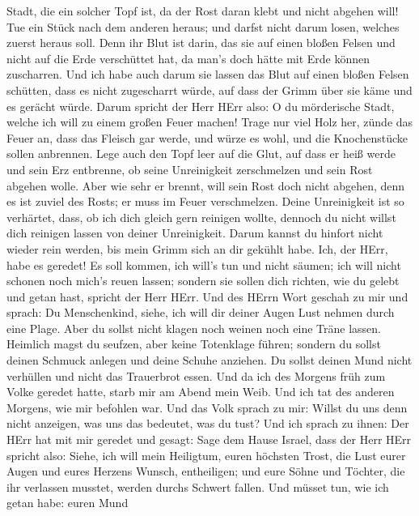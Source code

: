 Stadt, die ein solcher Topf ist, da der Rost daran klebt und nicht
abgehen will! Tue ein Stück nach dem anderen heraus; und darfst nicht
darum losen, welches zuerst heraus soll.  Denn ihr Blut ist
darin, das sie auf einen bloßen Felsen und nicht auf die Erde
verschüttet hat, da man's doch hätte mit Erde können zuscharren.
 Und ich habe auch darum sie lassen das Blut auf einen
bloßen Felsen schütten, dass es nicht zugescharrt würde, auf dass der
Grimm über sie käme und es gerächt würde.  Darum spricht der
Herr HErr also: O du mörderische Stadt, welche ich will zu einem großen
Feuer machen!  Trage nur viel Holz her, zünde das Feuer an,
dass das Fleisch gar werde, und würze es wohl, und die Knochenstücke
sollen anbrennen.  Lege auch den Topf leer auf die Glut,
auf dass er heiß werde und sein Erz entbrenne, ob seine Unreinigkeit
zerschmelzen und sein Rost abgehen wolle.  Aber wie sehr er
brennt, will sein Rost doch nicht abgehen, denn es ist zuviel des Rosts;
er muss im Feuer verschmelzen.  Deine Unreinigkeit ist so
verhärtet, dass, ob ich dich gleich gern reinigen wollte, dennoch du
nicht willst dich reinigen lassen von deiner Unreinigkeit. Darum kannst
du hinfort nicht wieder rein werden, bis mein Grimm sich an dir gekühlt
habe.  Ich, der HErr, habe es geredet! Es soll kommen, ich
will's tun und nicht säumen; ich will nicht schonen noch mich's reuen
lassen; sondern sie sollen dich richten, wie du gelebt und getan hast,
spricht der Herr HErr.  Und des HErrn Wort geschah zu mir
und sprach:  Du Menschenkind, siehe, ich will dir deiner
Augen Lust nehmen durch eine Plage. Aber du sollst nicht klagen noch
weinen noch eine Träne lassen.  Heimlich magst du seufzen,
aber keine Totenklage führen; sondern du sollst deinen Schmuck anlegen
und deine Schuhe anziehen. Du sollst deinen Mund nicht verhüllen und
nicht das Trauerbrot essen.  Und da ich des Morgens früh
zum Volke geredet hatte, starb mir am Abend mein Weib. Und ich tat des
anderen Morgens, wie mir befohlen war.  Und das Volk sprach
zu mir: Willst du uns denn nicht anzeigen, was uns das bedeutet, was du
tust?  Und ich sprach zu ihnen: Der HErr hat mit mir
geredet und gesagt:  Sage dem Hause Israel, dass der Herr
HErr spricht also: Siehe, ich will mein Heiligtum, euren höchsten Trost,
die Lust eurer Augen und eures Herzens Wunsch, entheiligen; und eure
Söhne und Töchter, die ihr verlassen musstet, werden durchs Schwert
fallen.  Und müsset tun, wie ich getan habe: euren Mund
